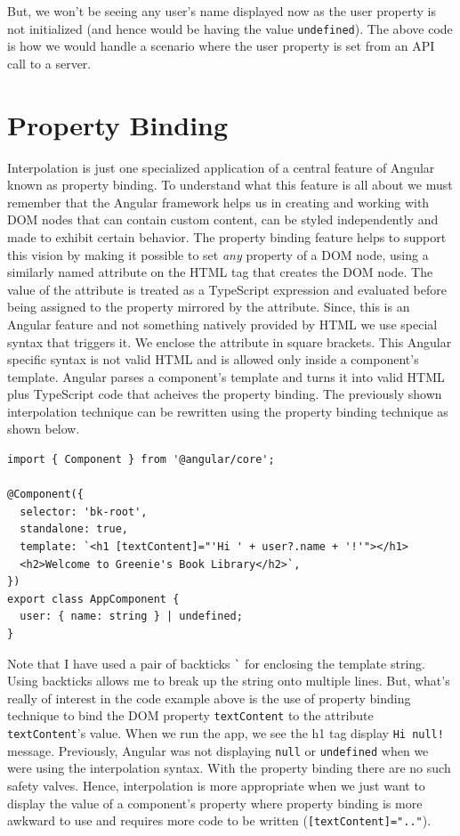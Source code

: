 \documentclass{report}
\begin{document}
But, we won't be seeing any user's name displayed now as the user property is not initialized (and hence would be having the value \verb|undefined|). The above code is how we would handle a scenario where the user property is set from an API call to a server.

\section{Property Binding}
Interpolation is just one specialized application of a central feature of Angular known as property binding. To understand what this feature is all about we must remember that the Angular framework helps us in creating and working with DOM nodes that can contain custom content, can be styled independently and made to exhibit certain behavior. The property binding feature helps to support this vision by making it possible to set \emph{any} property of a DOM node, using a similarly named attribute on the HTML tag that creates the DOM node. The value of the attribute is treated as a TypeScript expression and evaluated before being assigned to the property mirrored by the attribute. Since, this is an Angular feature and not something natively provided by HTML we use special syntax that triggers it. We enclose the attribute in square brackets. This Angular specific syntax is not valid HTML and is allowed only inside a component's template. Angular parses a component's template and turns it into valid HTML plus TypeScript code that acheives the property binding. The previously shown interpolation technique can be rewritten using the property binding technique as shown below.

\begin{Verbatim}[label=v2.1.3]
import { Component } from '@angular/core';

@Component({
  selector: 'bk-root',
  standalone: true,
  template: `<h1 [textContent]="'Hi ' + user?.name + '!'"></h1>
  <h2>Welcome to Greenie's Book Library</h2>`,
})
export class AppComponent {
  user: { name: string } | undefined;
}
\end{Verbatim}

Note that I have used a pair of backticks \verb|`| for enclosing the template string. Using backticks allows me to break up the string onto multiple lines. But, what's really of interest in the code example above is the use of property binding technique to bind the DOM property \verb|textContent| to the attribute \verb|textContent|'s value. When we run the app, we see the h1 tag display \texttt{Hi null!} message. Previously, Angular was not displaying \verb|null| or \verb|undefined| when we were using the interpolation syntax. With the property binding there are no such safety valves. Hence, interpolation is more appropriate when we just want to display the value of a component's property where property binding is more awkward to use and requires more code to be written (\verb|[textContent]=".."|).
\end{document}
